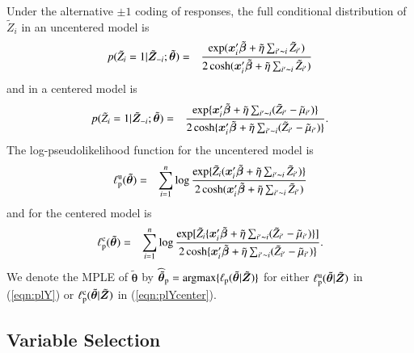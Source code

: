 \documentclass[authoryear,review, 12pt]{elsarticle}
\begin{document}
Under the alternative $\pm 1$ coding of responses, the full conditional distribution of $\tilde{Z}_i$ in an uncentered model is
\begin{eqnarray}
p(\tilde{Z}_i=1|\tilde{\bm{Z}}_{-i}; \tilde{\bm{\theta}})&=&\frac{\exp(\bm{x}_i'\tilde{\bm{\beta}}+\tilde{\eta}\sum_{i'\thicksim i}\tilde{Z}_{i'})}{2\cosh(\bm{x}_i'\tilde{\bm{\beta}}+\tilde{\eta}\sum_{i'\thicksim i}\tilde{Z}_{i'})}
\end{eqnarray}
and in a centered model is
\begin{eqnarray}
p(\tilde{Z}_i=1|\tilde{\bm{Z}}_{-i}; \tilde{\bm{\theta}})&=&\frac{\exp\{\bm{x}_i'\tilde{\bm{\beta}}+\tilde{\eta}\sum_{i'\thicksim i}(\tilde{Z}_{i'}-\tilde{\mu}_{i'})\}}{2\cosh\{\bm{x}_i'\tilde{\bm{\beta}}+\tilde{\eta}\sum_{i'\thicksim i}(\tilde{Z}_{i'}-\tilde{\mu}_{i'})\}}.
\end{eqnarray}
The log-pseudolikelihood function for the uncentered model is
\begin{eqnarray}
\ell_{\rm p}^{\rm u}(\tilde{\bm{\theta}})&=&\sum_{i=1}^n\log\frac{\exp\{\tilde{Z}_i(\bm{x}_i'\tilde{\bm{\beta}}+\tilde{\eta}\sum_{i'\thicksim i}\tilde{Z}_{i'})\}}{2\cosh(\bm{x}_i'\tilde{\bm{\beta}}+\tilde{\eta}\sum_{i'\thicksim i}\tilde{Z}_{i'})}
\label{eqn:plY}
\end{eqnarray}
and for the centered model is
\begin{eqnarray}
\ell_{\rm p}^{\rm c}(\tilde{\bm{\theta}})&=&\sum_{i=1}^n\log\frac{\exp[\tilde{Z}_i\{\bm{x}_i'\tilde{\bm{\beta}}+\tilde{\eta}\sum_{i'\thicksim i}(\tilde{Z}_{i'}-\tilde{\mu}_{i'})\}]}{2\cosh\{\bm{x}_i'\tilde{\bm{\beta}}+\tilde{\eta}\sum_{i'\thicksim i}(\tilde{Z}_{i'}-\tilde{\mu}_{i'})\}}.
\label{eqn:plYcenter}
\end{eqnarray}
We denote the MPLE of $\tilde{\bm{\theta}}$ by $\widehat{\tilde{\bm{\theta}}}_{\rm p}=\mbox{argmax}\{\ell_{\rm p}(\tilde{\bm{\theta}}|\tilde{\bm{Z}})\}$ for either $\ell_{\rm p}^{\rm u}(\tilde{\bm{\theta}}|\tilde{\bm{Z}})$ in (\ref{eqn:plY}) or $\ell_{\rm p}^{\rm c}(\tilde{\bm{\theta}}|\tilde{\bm{Z}})$ in (\ref{eqn:plYcenter}).

\subsection{Variable Selection}
\label{subsec:infer:varsel}
\end{document}
